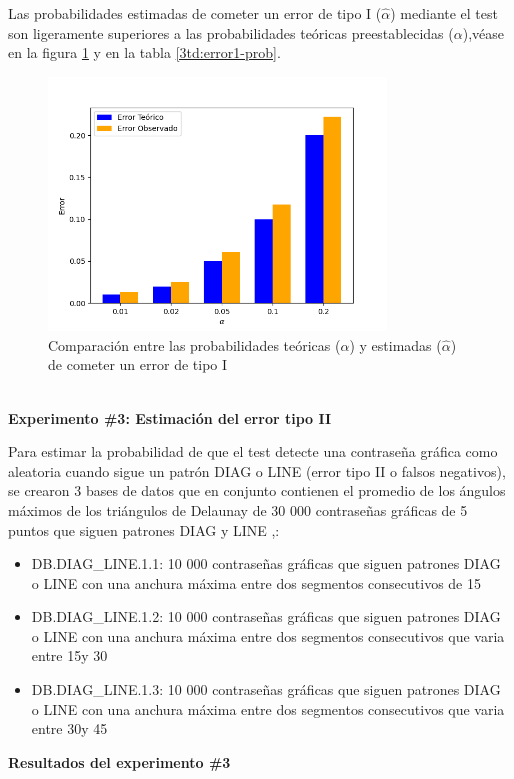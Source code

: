 \documentclass[12pt]{report}
\begin{document}
Las probabilidades estimadas de cometer un error de tipo I ($\hat{\alpha}$) mediante el test son ligeramente superiores  a las probabilidades teóricas preestablecidas ($\alpha$),véase en la figura \ref{Teorico vs Observado} y en la tabla \ref{3td:error1-prob}.
	\begin{figure}[ht]
	\centering
	
	\includegraphics[width=0.8\textwidth]{3td_teo_obs.png}
	\caption{Comparación entre las probabilidades teóricas ($\alpha$) y estimadas ($\hat{\alpha}$) de cometer un error de tipo I }
	\label{Teorico vs Observado}
\end{figure}\\

\textbf{Experimento \#3: Estimación del error tipo II}

Para estimar la probabilidad de que el test detecte una contraseña gráfica como aleatoria cuando sigue un patrón DIAG o LINE (error tipo II o falsos negativos), se crearon 3 bases de datos que en conjunto contienen el promedio de los ángulos máximos de los triángulos de Delaunay de  30 000 contraseñas gráficas de 5 puntos que siguen patrones DIAG y LINE ,:
\begin{itemize}
	\item DB.DIAG\_LINE.1.1: 10 000 contraseñas gráficas que siguen patrones DIAG o LINE con una anchura máxima entre dos segmentos consecutivos de 15\degree 
	\item DB.DIAG\_LINE.1.2: 10 000 contraseñas gráficas que siguen patrones DIAG o LINE con una anchura máxima entre dos segmentos consecutivos que varia entre 15\degree y 30\degree 
	\item DB.DIAG\_LINE.1.3: 10 000 contraseñas gráficas que siguen patrones DIAG o LINE con una anchura máxima entre dos segmentos consecutivos que varia entre 30\degree y 45\degree 
\end{itemize}
\textbf{Resultados del experimento \#3}
\end{document}
